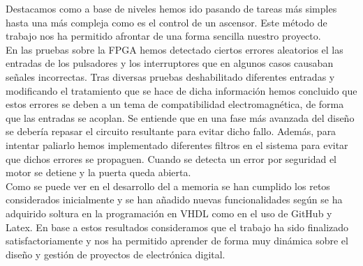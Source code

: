 	Destacamos como a base de niveles hemos ido pasando de tareas más simples hasta una más compleja como es el control de un ascensor. Este método de trabajo nos ha permitido afrontar de una forma sencilla nuestro proyecto. \\

	En las pruebas sobre la FPGA hemos detectado ciertos errores aleatorios el las entradas de los pulsadores y los interruptores que en algunos casos causaban señales incorrectas. Tras diversas pruebas deshabilitado diferentes entradas y modificando el tratamiento que se hace de dicha información hemos concluido que estos errores se deben a un tema de compatibilidad electromagnética, de forma que las entradas se acoplan. Se entiende que en una fase más avanzada del diseño se debería repasar el circuito resultante para evitar dicho fallo. Además, para intentar paliarlo hemos implementado diferentes filtros en el sistema para evitar que dichos errores se propaguen. Cuando se detecta un error por seguridad el motor se detiene y la puerta queda abierta.\\ 

	Como se puede ver en el desarrollo del a memoria se han cumplido los retos considerados inicialmente y se han añadido nuevas funcionalidades según se ha adquirido soltura en la programación en VHDL como en el uso de GitHub y Latex. En base a estos resultados consideramos que el trabajo ha sido finalizado satisfactoriamente y nos ha permitido aprender de forma muy dinámica sobre el diseño y gestión de proyectos de electrónica digital.
